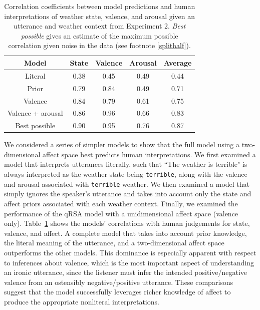 \documentclass[10pt,letterpaper]{article}
\begin{document}
\begin{table}
\begin{tabular}{ |c | c | c | c | c | }
  \hline
  \textbf{Model} & \textbf{State} & \textbf{Valence} & \textbf{Arousal} & \textbf{Average} \\\hline                        
  Literal & 0.38 & 0.45 & 0.49 & 0.44\\
  Prior & 0.79 & 0.84 & 0.49 &  0.71 \\
  Valence & 0.84 & 0.79 & 0.61 & 0.75 \\
  Valence + arousal & 0.86 & 0.96 & 0.66 & 0.83\\
  \hline 
  Best possible & 0.90 & 0.95 & 0.76 & 0.87\\\hline
\end{tabular}
\caption{Correlation coefficients between model predictions and human interpretations of weather state, valence, and arousal given an utterance and weather context from Experiment 2. \emph{Best possible} gives an estimate of the maximum possible correlation given noise in the data (see footnote \ref{splithalf}).}
\label{table1}
\end{table}

We considered a series of simpler models to show that the full model using a two-dimensional affect space best predicts human interpretations. 
We first examined a model that interprets utterances literally, such that ``The weather is terrible" is always interpreted as the weather state being \texttt{terrible}, along with the valence and arousal associated with \texttt{terrible} weather. 
We then examined a model that simply ignores the speaker's utterance and takes into account only the state and affect priors associated with each weather context. 
Finally, we examined the performance of the qRSA model with a unidimensional affect space (valence only). 
Table~\ref{table1} shows the models' correlations with human judgements for state, valence, and affect.
A complete model that takes into account prior knowledge, the literal meaning of the utterance, and a two-dimensional affect space outperforms the other models. This dominance is especially apparent with respect to inferences about valence, which is the most important aspect of understanding an ironic utterance, since the listener must infer the intended positive/negative valence from an ostensibly negative/positive utterance. These comparisons suggest that the model successfully leverages richer knowledge of affect to produce the appropriate nonliteral interpretations.
\end{document}
